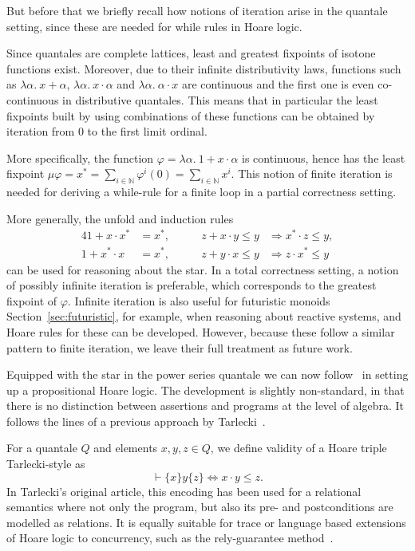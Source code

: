 \documentclass[12pt]{article}
\theoremstyle{definition}
\newcommand{\refsec}[1]{Section~\ref{#1}}
\begin{document}
But before that we briefly recall how notions of iteration arise in
the quantale setting, since these are needed for while rules in Hoare
logic. 

Since quantales are complete lattices, least and greatest fixpoints of
isotone functions exist. Moreover, due to their infinite
distributivity laws, functions such as $\lambda \alpha.\ x+ \alpha$,
$\lambda \alpha.\ x\cdot \alpha$ and $\lambda \alpha.\ \alpha\cdot x$
are continuous and the first one is even co-continuous in distributive
quantales. This means that in particular the least fixpoints built by
using combinations of these functions can be obtained by iteration
from $0$ to the first limit ordinal.

More specifically, the function $\varphi=\lambda\alpha.\ 1+x\cdot
\alpha$ is continuous, hence has the least fixpoint
$\mu\varphi=x^\ast=\sum_{i\in\mathbb{N}}\varphi^i(0)=\sum_{i\in\mathbb{N}}x^i$. This
notion of finite iteration is needed for deriving a while-rule for a
finite loop in a partial correctness setting.

More generally, the unfold and induction rules
\begin{alignat*}{4}
  1+x\cdot x^\ast &= x^\ast,&\qquad z+x\cdot y \le y&\Rightarrow 
  x^\ast\cdot z\le y,\\
  1+x^\ast\cdot x &= x^\ast,&\qquad z+y\cdot x \le y&\Rightarrow 
  z\cdot x^\ast\le y
\end{alignat*}
can be used for reasoning about the star. In a total correctness
setting, a notion of possibly infinite iteration is preferable, which
corresponds to the greatest fixpoint of $\varphi$. Infinite iteration
is also useful for futuristic monoids \refsec{sec:futuristic}, for
example, when reasoning about reactive systems, and Hoare rules for
these can be developed. However, because these follow a similar
pattern to finite iteration, we leave their full treatment as future
work.



Equipped with the star in the power series quantale we can now
follow~\cite{HMSW11} in setting up a propositional Hoare logic. The
development is slightly non-standard, in that there is no distinction
between assertions and programs at the level of algebra. It follows
the lines of a previous approach by Tarlecki~\cite{tarlecki}.
 
For a quantale $Q$ and elements $x,y,z\in Q$, we define validity of a
Hoare triple Tarlecki-style as
\begin{equation*}
  \vdash\{x\}y\{z\} \Leftrightarrow x\cdot y\le z.
\end{equation*}
In Tarlecki's original article, this encoding has been used for a
relational semantics where not only the program, but also its pre- and
postconditions are modelled as relations.  It is equally suitable for
trace or language based extensions of Hoare logic to concurrency, such
as the rely-guarantee method~\cite{Jon83}.
\end{document}
